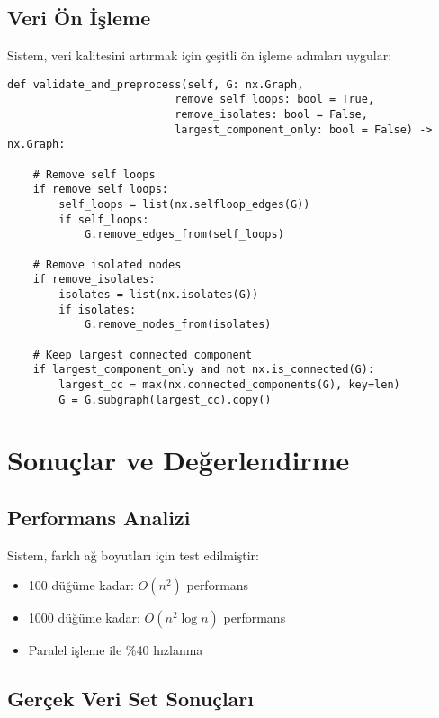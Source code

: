 \documentclass[conference]{IEEEtran}
\begin{document}
\subsection{Veri Ön İşleme}

Sistem, veri kalitesini artırmak için çeşitli ön işleme adımları uygular:

\begin{lstlisting}[caption=Data Preprocessing]
def validate_and_preprocess(self, G: nx.Graph, 
                          remove_self_loops: bool = True,
                          remove_isolates: bool = False, 
                          largest_component_only: bool = False) -> nx.Graph:
    
    # Remove self loops
    if remove_self_loops:
        self_loops = list(nx.selfloop_edges(G))
        if self_loops:
            G.remove_edges_from(self_loops)
    
    # Remove isolated nodes
    if remove_isolates:
        isolates = list(nx.isolates(G))
        if isolates:
            G.remove_nodes_from(isolates)
    
    # Keep largest connected component
    if largest_component_only and not nx.is_connected(G):
        largest_cc = max(nx.connected_components(G), key=len)
        G = G.subgraph(largest_cc).copy()
\end{lstlisting}

\section{Sonuçlar ve Değerlendirme}

\subsection{Performans Analizi}

Sistem, farklı ağ boyutları için test edilmiştir:

\begin{itemize}
\item 100 düğüme kadar: $O(n^2)$ performans
\item 1000 düğüme kadar: $O(n^2 \log n)$ performans
\item Paralel işleme ile \%40 hızlanma
\end{itemize}

\subsection{Gerçek Veri Set Sonuçları}
\end{document}
